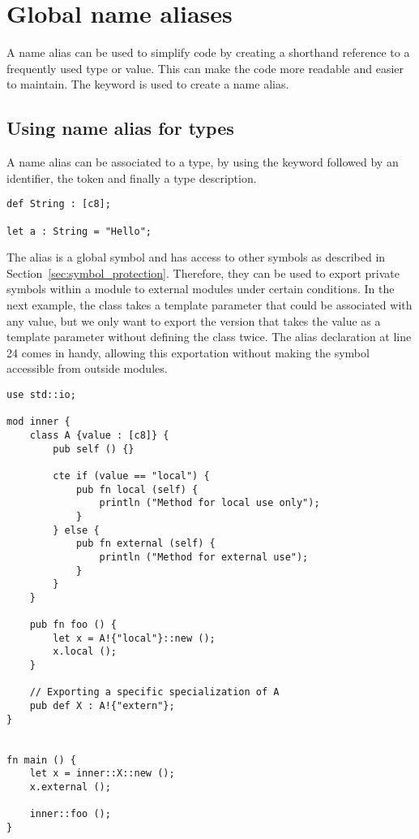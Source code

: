 \section{Global name aliases}
\label{sec:global_alias_names}

A name alias can be used to simplify code by creating a shorthand reference to a
frequently used type or value. This can make the code more readable and easier
to maintain. The keyword  is used to create a name alias.

\subsection {Using name alias for types}

A name alias can be associated to a type, by using the keyword 
followed by an identifier, the token \token{:} and finally a type description.

\begin{lstlisting}[style=coloredverbatim]
def String : [c8];

let a : String = "Hello";
\end{lstlisting}

The alias is a global symbol and has access to other symbols as described in
Section~\ref{sec:symbol_protection}. Therefore, they can be used to export
private symbols within a module to external modules under certain conditions. In
the next example, the class  takes a template parameter that could be
associated with any value, but we only want to export the version that takes the
value  as a template parameter without defining the class twice.
The alias declaration  at line 24 comes in handy, allowing this
exportation without making the symbol  accessible from outside modules.

\begin{lstlisting}[style=coloredverbatim]
use std::io;

mod inner {
    class A {value : [c8]} {
        pub self () {}

        cte if (value == "local") {
            pub fn local (self) {
                println ("Method for local use only");
            }
        } else {
            pub fn external (self) {
                println ("Method for external use");
            }
        }
    }

    pub fn foo () {
        let x = A!{"local"}::new ();
        x.local ();
    }

    // Exporting a specific specialization of A
    pub def X : A!{"extern"};
}


fn main () {
    let x = inner::X::new ();
    x.external ();

    inner::foo ();
}
\end{lstlisting}

